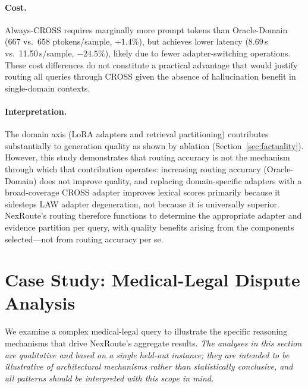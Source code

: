 \documentclass[a4paper,fleql]{cas-sc}
\begin{document}
\paragraph{Cost.}
Always-CROSS requires marginally more prompt tokens than Oracle-Domain
(667 vs.\ 658 ptokens/sample, $+1.4$\%), but achieves lower latency
(8.69\,s vs.\ 11.50\,s/sample, $-24.5$\%), likely due to fewer adapter-switching
operations.
These cost differences do not constitute a practical advantage that would justify
routing all queries through CROSS given the absence of hallucination benefit
in single-domain contexts.

\paragraph{Interpretation.}
The domain axis (LoRA adapters and retrieval partitioning) contributes
substantially to generation quality as shown by ablation (Section~\ref{sec:factuality}).
However, this study demonstrates that routing accuracy is not the mechanism through
which that contribution operates: increasing routing accuracy (Oracle-Domain)
does not improve quality, and replacing domain-specific adapters with a
broad-coverage CROSS adapter improves lexical scores primarily because it
sidesteps LAW adapter degeneration, not because it is universally superior.
NexRoute's routing therefore functions to determine the appropriate adapter
and evidence partition per query, with quality benefits arising from the
components selected---not from routing accuracy per se.

\section{Case Study: Medical-Legal Dispute Analysis}
\label{sec:casestudy}
We examine a complex medical-legal query to illustrate the specific reasoning mechanisms that drive NexRoute's aggregate results. \emph{The analyses in this section are qualitative and based on a single held-out instance; they are intended to be illustrative of architectural mechanisms rather than statistically conclusive, and all patterns should be interpreted with this scope in mind.}

\end{document}

